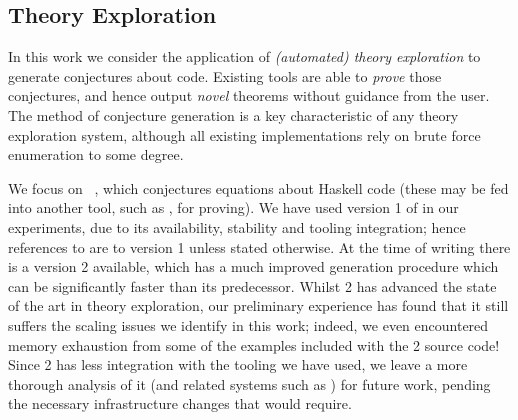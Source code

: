 \subsection{Theory Exploration}
\label{sec:theoryexploration}

\iffalse
Theory exploration is the task of taking a \emph{signature} of definitions in
some formal system (for example a programming language) and automatically
generating a set of formal statements (properties) involving those
definitions. These may be conjectures or theorems (proven either by sending
conjectures to an automated theorem prover, or by having the generating
procedure proceed in logically sound steps); in either case, these statements
must also be ``interesting'' in some way. It is beyond the scope of this paper
to define what makes a mathematical statement ``interesting'', but this problem
has been tackled extensively in the literature~\cite{colton2000notion}.
\fi

In this work we consider the application of \emph{(automated) theory
  exploration} to generate conjectures about code. Existing tools are able to
\emph{prove} those conjectures, and hence output \emph{novel} theorems without
guidance from the user. The method of conjecture generation is a key
characteristic of any theory exploration system, although all existing
implementations rely on brute force enumeration to some degree.

We focus on \qspec{}~\cite{QuickSpec}, which conjectures equations about Haskell
code (these may be fed into another tool, such as \hspec{}, for proving). We
have used version 1 of \qspec{} in our experiments, due to its availability,
stability and tooling integration; hence references to \qspec{} are to version 1
unless stated otherwise. At the time of writing there is a \qspec{} version 2
available, which has a much improved generation procedure which can be
significantly faster than its predecessor. Whilst \qspec{} 2 has advanced the
state of the art in theory exploration, our preliminary experience has found
that it still suffers the scaling issues we identify in this work; indeed, we
even encountered memory exhaustion from some of the examples included with the
\qspec{} 2 source code! Since \qspec{} 2 has less integration with the tooling
we have used, we leave a more thorough analysis of it (and related systems such
as \speculate{}) for future work, pending the necessary infrastructure changes
that would require.

